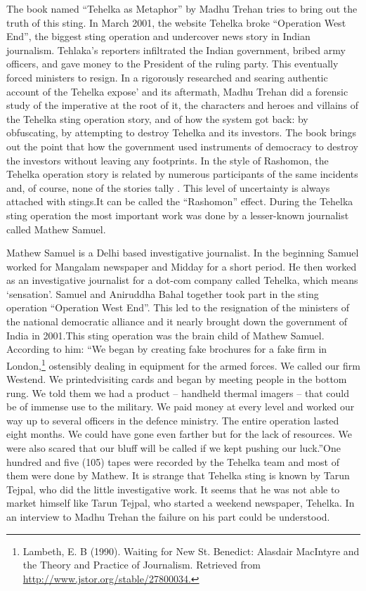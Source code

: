 \begin{multicols}{2}
\noi
The book named “Tehelka as Metaphor” by Madhu Trehan tries to bring out the truth of this
sting. In March 2001, the website Tehelka broke “Operation West End”, the biggest sting
operation and undercover news story in Indian journalism. Tehlaka’s reporters infiltrated the
Indian government, bribed army officers, and gave money to the President of the ruling party.
This eventually forced ministers to resign. In a rigorously researched and searing authentic
account of the Tehelka expose’ and its aftermath, Madhu Trehan did a forensic study of the
imperative at the root of it, the characters and heroes and villains of the Tehelka sting operation
story, and of how the system got back: by obfuscating, by attempting to destroy Tehelka and
its investors. The book brings out the point that how the government used instruments of
democracy to destroy the investors without leaving any footprints. In the style of Rashomon,
the Tehelka operation story is related by numerous participants of the same incidents and, of
course, none of the stories tally . This level of uncertainty is always attached with stings.It can
be called the “Rashomon” effect. During the Tehelka sting operation the most important work
was done by a lesser-known journalist called Mathew Samuel.


\noi
Mathew Samuel is a Delhi based investigative journalist. In the beginning Samuel worked for
Mangalam newspaper and Midday for a short period. He then worked as an investigative
journalist for a dot-com company called Tehelka, which means ‘sensation’. Samuel and
Aniruddha Bahal together took part in the sting operation “Operation West End”. This led to
the resignation of the ministers of the national democratic alliance and it nearly brought down
the government of India in 2001.This sting operation was the brain child of Mathew Samuel.
According to him: “We began by creating fake brochures for a fake firm in London,\footnote{Lambeth, E. B (1990). Waiting for New St. Benedict: Alasdair MacIntyre and the Theory and Practice of Journalism. Retrieved from \url{http://www.jstor.org/stable/27800034.}} ostensibly dealing in equipment for the armed forces. We called our firm Westend. We printedvisiting cards and began by meeting people in the bottom rung. We told them we had a product – handheld thermal imagers – that could be of immense use to the military. We paid money at
every level and worked our way up to several officers in the defence ministry. The entire
operation lasted eight months. We could have gone even farther but for the lack of resources.
We were also scared that our bluff will be called if we kept pushing our luck.”One hundred and
five (105) tapes were recorded by the Tehelka team and most of them were done by Mathew.
It is strange that Tehelka sting is known by Tarun Tejpal, who did the little investigative work.
It seems that he was not able to market himself like Tarun Tejpal, who started a weekend
newspaper, Tehelka. In an interview to Madhu Trehan the failure on his part could be
understood.


\end{multicols}
